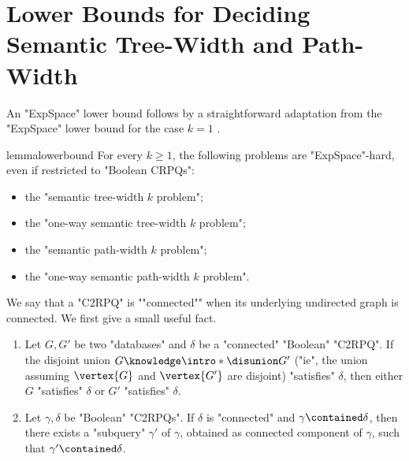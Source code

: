 

\section{\AP{}Lower Bounds for Deciding Semantic Tree-Width and Path-Width}
\label{sec:lowerbound}

An "ExpSpace" lower bound follows by a straightforward adaptation from the
"ExpSpace" lower bound for the case $k=1$ \cite[Proposition 6.2]{BarceloRomeroVardi2016SemanticAcyclicity}.
\begin{restatable}{lemma}{lowerbound}
    \AP\label{lemma:lowerbound}
    For every $k\geq 1$, the following problems are "ExpSpace"-hard, even if restricted to "Boolean CRPQs":
	\begin{itemize}
		\item the "semantic tree-width $k$ problem";
		\item the "one-way semantic tree-width $k$ problem";
		\item the "semantic path-width $k$ problem";
		\item the "one-way semantic path-width $k$ problem".
	\end{itemize}
\end{restatable}

\AP We say that a "C2RPQ" is ""connected"" when its underlying undirected graph is connected.
We first give a small useful fact.

\begin{fact}
    \AP\label{fact:connectedness}\leavevmode
    \begin{enumerate}
        \item Let $G, G'$ be two "databases" and $\delta$ be a "connected" "Boolean" "C2RPQ".
            If the disjoint union $G \AP\intro*\disunion G'$ ("ie", the union assuming $\vertex{G}$ and $\vertex{G'}$ are disjoint) "satisfies" $\delta$, then either $G$ "satisfies" $\delta$ or
            $G'$ "satisfies" $\delta$.
        \item Let $\gamma,\delta$ be "Boolean" "C2RPQs". If $\delta$ is "connected"
            and $\gamma \contained \delta$, then there exists a "subquery" $\gamma'$ of $\gamma$,
            obtained as connected component of $\gamma$, such that
            $\gamma' \contained \delta$. 
    \end{enumerate}
\end{fact}

